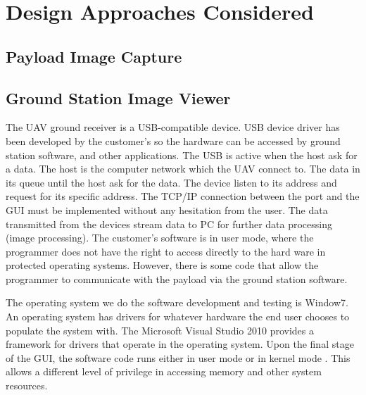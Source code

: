 \chapter{Design Approaches Considered}

\section{Payload Image Capture}










\section{Ground Station Image Viewer}
The UAV ground receiver is a USB-compatible device. USB device driver has been developed by the customer’s so the hardware can be accessed by ground station software, and other applications. The USB is active when the host ask for a data. The host is the computer network which the UAV connect to. The data in its queue until the host ask for the data. The device listen to its address and request for its specific address. The TCP/IP connection between the port and the GUI must be implemented without any hesitation from the user. The data transmitted from the devices stream data to PC for further data processing (image processing).  The customer’s software is in user mode, where the programmer does not have the right to access directly to the hard ware in protected operating systems. However, there is some code that allow the programmer to communicate with the payload via the ground station software.

The operating system we do the software development and testing is Window7. An operating system has drivers for whatever hardware the end user chooses to populate the system with. The Microsoft Visual Studio 2010 provides a framework for drivers that operate in the operating system. Upon the final stage of the GUI, the software code runs either in user mode or in kernel mode \cite{tsuiK}. This allows a different level of privilege in accessing memory and other system resources. 
